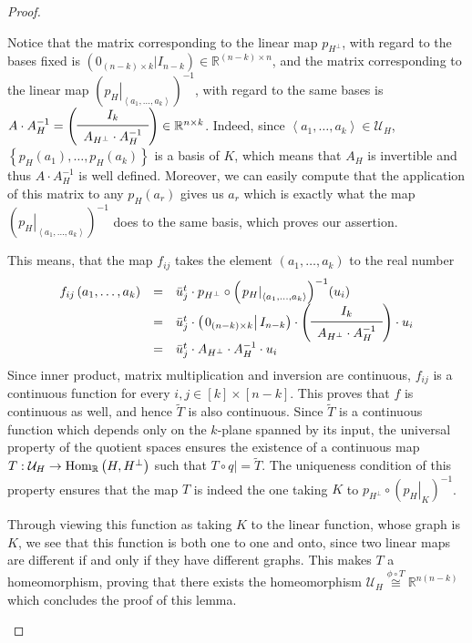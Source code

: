 \begin{proof}
\begin{b_item}
Notice that the matrix corresponding to the linear map $p_{H^{\perp}}$, with regard to the bases fixed is
$\left(0_{(n-k)\times k}|I_{n-k}\right)\in\mathbb{R}^{(n-k)\times n}$,
and the matrix corresponding to the linear map ${\left(\left.p_H\right|_{\left<a_1,\ldots,a_k\right>}\right)}^{-1}$, with regard to the same bases is
$A\cdot A_H^{-1}=\left(\begin{array}{c}
I_k\\
\midrule
A_{H^{\perp}}\cdot A_H^{-1}\\
\end{array}\right)
\in\mathbb{R}^{n\times{k}}$.
Indeed, since $\left<a_1,\ldots,a_k\right>\in\mathcal{U}_H$, $\left\{p_H(a_1),\ldots,p_H(a_k)\right\}$ is a basis of $K$, which means that $A_H$ is invertible and thus $A\cdot A_H^{-1}$ is well defined. Moreover, we can easily compute that the application of this matrix to any $p_H(a_r)$ gives us $a_r$ which is exactly what the map ${\left({\left.p_H\right|}_{\left<a_1,\ldots,a_k\right>}\right)}^{-1}$ does to the same basis, which proves our assertion.

This means, that the map $f_{ij}$ takes the element $\left(a_1,\ldots,a_k\right)$ to the real number
\[\begin{array}{rcl}f_{ij}\left(a_1,\ldots,a_k\right)
&=&\bar{u}_j^t\cdot p_{H^{\perp}}\circ{\left(\left.p_H\right|_{\left<a_1,\ldots,a_k\right>}\right)}^{-1}(u_i)\\
&=&\bar{u}_j^t\cdot\left(\left.0_{(n-k)\times k}\right|I_{n-k}\right)\cdot\left(\begin{array}{c}I_k\\\midrule A_{H^{\perp}}\cdot A_H^{-1}\\\end{array}\right)\cdot u_i\\
&=&\bar{u}_j^t\cdot A_{H^{\perp}}\cdot A_H^{-1}\cdot u_i\\
\end{array}\]
Since inner product, matrix multiplication and inversion are continuous, $f_{ij}$ is a continuous function for every $i,j\in[k]\times[n-k]$. This proves that $f$ is continuous as well, and hence $\tilde T$ is also continuous. Since $\tilde T$ is a continuous function which depends only on the $k$-plane spanned by its input, the universal property of the quotient spaces ensures the existence of a continuous map $T:\mathcal{U}_H\to\mathrm{Hom}_{\mathbb{R}}\left(H,H^{\perp}\right)$ such that $T\circ \left.q\right|=\tilde T$. The uniqueness condition of this property ensures that the map $T$ is indeed the one taking $K$ to $p_{H^{\perp}}\circ{\left(\left.p_H\right|_K\right)}^{-1}$.

Through viewing this function as taking $K$ to the linear function, whose graph is $K$, we see that this function is both one to one and onto, since two linear maps are different if and only if they have different graphs. This makes $T$ a homeomorphism, proving that there exists the homeomorphism
$\mathcal{U}_H\overset{\phi\circ T}{\cong}\mathbb{R}^{n(n-k)}$
which concludes the proof of this lemma.\qedhere
\end{b_item}
\end{proof}
